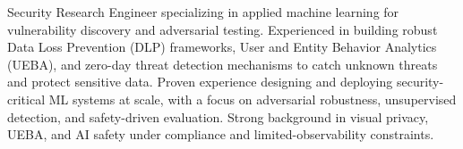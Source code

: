 
\begin{cvparagraph}
{
    Security Research Engineer specializing in applied machine learning for 
    vulnerability discovery and adversarial testing. 
    Experienced in building robust Data Loss Prevention (DLP) frameworks, 
    User and Entity Behavior Analytics (UEBA), 
    and zero-day threat detection mechanisms to catch unknown threats and protect sensitive data. 
    Proven experience designing and deploying security-critical ML systems at scale, 
    with a focus on adversarial robustness, unsupervised detection, and safety-driven evaluation. 
    Strong background in visual privacy, UEBA, and AI safety under compliance and 
    limited-observability constraints.
}
\end{cvparagraph}
